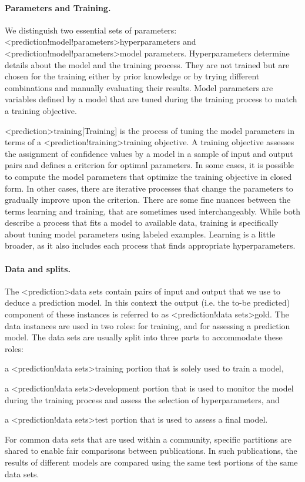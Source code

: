 \documentclass[../document.tex]{subfiles}
\begin{document}
    \paragraph{Parameters and Training.}
    We distinguish two essential sets of parameters: <prediction!model!parameters>{hyperparameters} and <prediction!model!parameters>{model parameters}.
    Hyperparameters determine details about the model and the training process. %
    They are not trained but are chosen for the training either by prior knowledge or by trying different combinations and manually evaluating their results.
    Model parameters are variables defined by a model that are tuned during the training process to match a training objective.

    <prediction>{training}[Training] is the process of tuning the model parameters in terms of a <prediction!training>{training objective}.
    A training objective assesses the assignment of confidence values by a model in a sample of input and output pairs and defines a criterion for optimal parameters.
    In some cases, it is possible to compute the model parameters that optimize the training objective in closed form.
    In other cases, there are iterative processes that change the parameters to gradually improve upon the criterion.
    There are some fine nuances between the terms learning and training, that are sometimes used interchangeably.
    While both describe a process that fits a model to available data, training is specifically about tuning model parameters using labeled examples.
    Learning is a little broader, as it also includes each process that finds appropriate hyperparameters.


    \paragraph{Data and splits.}
    The <prediction>{data sets} contain pairs of input and output that we use to deduce a prediction model.
    In this context the output (i.e. the to-be predicted) component of these instances is referred to as <prediction!data sets>{gold}.
    The data instances are used in two roles: for training, and for assessing a prediction model.
    The data sets are usually split into three parts to accommodate these roles:
    \begin{inparaenum}
        \item a <prediction!data sets>{training portion} that is solely used to train a model,
        \item a <prediction!data sets>{development portion} that is used to monitor the model during the training process and assess the selection of hyperparameters, and
        \item a <prediction!data sets>{test portion} that is used to assess a final model.
    \end{inparaenum}
    For common data sets that are used within a community, specific partitions are shared to enable fair comparisons between publications.
    In such publications, the results of different models are compared using the same test portions of the same data sets.
\end{document}

